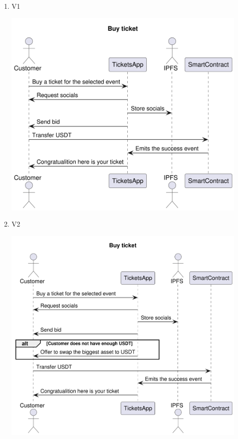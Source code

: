 \documentclass[11pt]{article}
\begin{document}
\begin{enumerate}
\item V1
\label{sec:orgfb97a09}
\begin{center}
\includegraphics[width=0.95\textwidth]{./img/v1-buy-ticket.png}
\label{orgc790f98}
\end{center}
\item V2
\label{sec:org04cca44}
\begin{center}
\includegraphics[width=0.95\textwidth]{./img/v2-buy-ticket.png}
\label{org055ca5d}
\end{center}
\end{enumerate}
\end{document}

